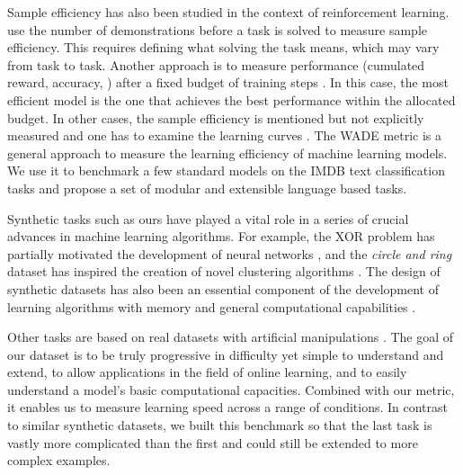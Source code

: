 Sample efficiency has also been studied in the context of
reinforcement learning. \parencite{chevalier-boisvertBabyaiPlatformStudy2018} use the
number of demonstrations before a task is solved to measure sample efficiency.
This requires defining what solving the task means, which may vary from task to
task. Another approach is to measure performance (cumulated reward, accuracy,
\etc) after a fixed budget of training steps
\parencite{yaratsImprovingSampleEfficiency2019}. In this case, the most efficient
model is the one that achieves the best performance within the allocated budget.
In other cases, the sample efficiency is mentioned but not explicitly measured
and one has to examine the learning curves
\parencite{buckmanSampleefficientReinforcementLearning2018}. The \ac{WADE} metric is
a general approach to measure the learning efficiency of machine learning
models. We use it to benchmark a few standard models on the IMDB text
classification tasks \parencite{maasLearningWordVectors2011} and propose a set of
modular and extensible language based tasks.

Synthetic tasks such as ours have played a vital role in a series of crucial
advances in machine learning algorithms. For example, the XOR problem has
partially motivated the development of neural networks
\parencite{minskyPerceptronsIntroductionComputational1972,
  rumelhartLearningInternalRepresentations1985}, and the \emph{circle and ring}
dataset has inspired the creation of novel clustering algorithms
\parencite{ngSpectralClusteringAnalysis2001}. The design of synthetic datasets has also been
an essential component of the development of learning algorithms with
memory and general computational capabilities
\parencite{hochreiterLongShortTermMemory1997,
  joulinInferringAlgorithmicPatterns2015, gravesNeuralTuringMachines2014,
  westonAICompleteQuestionAnswering2016, richardsonProbingNaturalLanguage2020}.

Other tasks are based on real datasets with artificial manipulations
\parencite{krizhevskyLearningMultipleLayers2009, srivastavaCompeteCompute2013a,
  goodfellowEmpiricalInvestigationCatastrophic2014,
  nguyenVariationalContinualLearning2017}. The goal of our dataset is to be
truly progressive in difficulty yet simple to understand and extend, to allow
applications in the field of online learning, and to easily understand a model's
basic computational capacities. Combined with our metric, it enables us to
measure learning speed across a range of conditions. In contrast to similar
synthetic datasets, we built this benchmark so that the last task is vastly more
complicated than the first and could still be extended to more complex examples.




